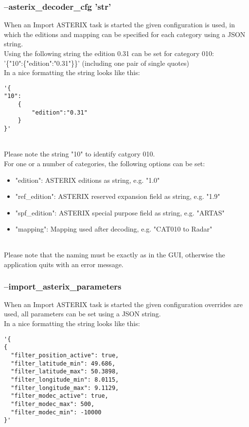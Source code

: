 \subsubsection{--asterix\_decoder\_cfg 'str'}

When an Import ASTERIX task is started the given configuration is used, in which the editions and mapping can be specified for each category using a JSON string. \\

Using the following string the edition 0.31 can be set for category 010:  \\
'\{"10":\{"edition":"0.31"\}\}' (including one pair of single quotes) \\

In a nice formatting the string looks like this:
\begin{lstlisting}[basicstyle=\small\ttfamily]
'{
"10":
    {
        "edition":"0.31"
    }
}'
\end{lstlisting}
\ \\

Please note the string "10" to identify catgory 010. \\

For one or a number of categories, the following options can be set:

\begin{itemize}
\item "edition":  ASTERIX editions as string, e.g. "1.0"
\item "ref\_edition":  ASTERIX reserved expansion field as string, e.g. "1.9"
\item "spf\_edition": ASTERIX special purpose field as string, e.g. "ARTAS"
\item "mapping": Mapping used after decoding, e.g. "CAT010 to Radar"
\end{itemize}
\ \\

Please note that the naming must be exactly as in the GUI, otherwise the application quits with an error message.

\subsubsection{--import\_asterix\_parameters}

When an Import ASTERIX task is started the given configuration overrides are used, all parameters can be set using a JSON string. \\

In a nice formatting the string looks like this:
\begin{lstlisting}[basicstyle=\small\ttfamily]
'{
{
  "filter_position_active": true,
  "filter_latitude_min": 49.686,
  "filter_latitude_max": 50.3898,
  "filter_longitude_min": 8.0115,
  "filter_longitude_max": 9.1129,
  "filter_modec_active": true,
  "filter_modec_max": 500,
  "filter_modec_min": -10000
}'
\end{lstlisting}
\ \\

